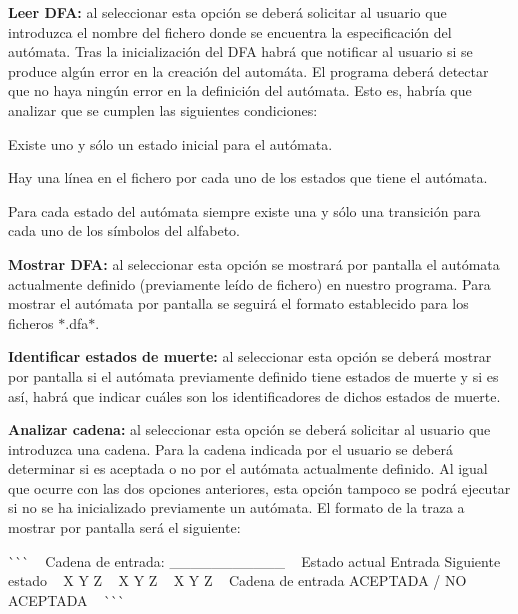 \begin{DoxyItemize}
\item {\bfseries Leer D\+FA\+:} al seleccionar esta opción se deberá solicitar al usuario que introduzca el nombre del fichero donde se encuentra la especificación del autómata. Tras la inicialización del D\+FA habrá que notificar al usuario si se produce algún error en la creación del automáta. El programa deberá detectar que no haya ningún error en la definición del autómata. Esto es, habría que analizar que se cumplen las siguientes condiciones\+:
\begin{DoxyItemize}
\item Existe uno y sólo un estado inicial para el autómata.
\item Hay una línea en el fichero por cada uno de los estados que tiene el autómata.
\item Para cada estado del autómata siempre existe una y sólo una transición para cada uno de los símbolos del alfabeto.
\end{DoxyItemize}
\item {\bfseries Mostrar D\+FA\+:} al seleccionar esta opción se mostrará por pantalla el autómata actualmente definido (previamente leído de fichero) en nuestro programa. Para mostrar el autómata por pantalla se seguirá el formato establecido para los ficheros $\ast$.dfa$\ast$.
\item {\bfseries Identificar estados de muerte\+:} al seleccionar esta opción se deberá mostrar por pantalla si el autómata previamente definido tiene estados de muerte y si es así, habrá que indicar cuáles son los identificadores de dichos estados de muerte.
\item {\bfseries Analizar cadena\+:} al seleccionar esta opción se deberá solicitar al usuario que introduzca una cadena. Para la cadena indicada por el usuario se deberá determinar si es aceptada o no por el autómata actualmente definido. Al igual que ocurre con las dos opciones anteriores, esta opción tampoco se podrá ejecutar si no se ha inicializado previamente un autómata. El formato de la traza a mostrar por pantalla será el siguiente\+:

\`{}\`{}\`{} ~\newline
 Cadena de entrada\+: \+\_\+\+\_\+\+\_\+\+\_\+\+\_\+\+\_\+\+\_\+\+\_\+\+\_\+\+\_\+\+\_\+ ~\newline
 Estado actual Entrada Siguiente estado ~\newline
 X Y Z ~\newline
 X Y Z ~\newline
 X Y Z ~\newline
 Cadena de entrada A\+C\+E\+P\+T\+A\+DA / NO A\+C\+E\+P\+T\+A\+DA ~\newline
 \`{}\`{}\`{}


\end{DoxyItemize}
